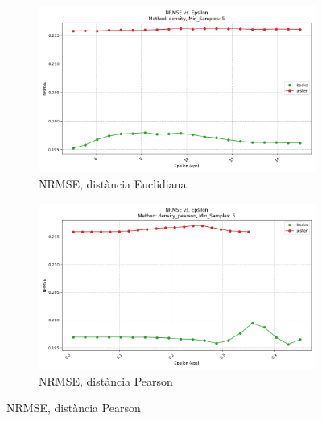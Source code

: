 \documentclass[a4paper,12pt]{report}
\begin{document}
\begin{figure}[H]
    \begin{subfigure}[b]{0.49\textwidth}
        \includegraphics[width=\textwidth]{Figuras/DBSCAN/res/books_jester_density_nrmse_vs_eps.png}
        \caption{NRMSE, distància Euclidiana}
        \label{fig:dbscan2-clustering-results-c}
    \end{subfigure}
    \hfill
    \begin{subfigure}[b]{0.49\textwidth}
        \includegraphics[width=\textwidth]{Figuras/DBSCAN/res/books_jester_density_pearson_nrmse_vs_eps.png}
        \caption{NRMSE, distància Pearson}
        \label{fig:dbscan2-clustering-results-d}
    \end{subfigure}

    \vspace{1em}


\end{figure}
\end{document}
